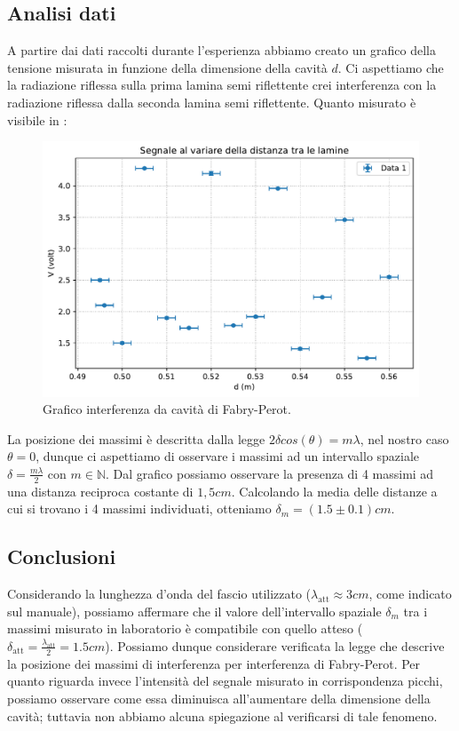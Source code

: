 \documentclass[a4paper]{article}
\begin{document}
\subsection{Analisi dati}
A partire dai dati raccolti durante l'esperienza abbiamo creato un grafico della tensione misurata in funzione della dimensione della cavità $d$. Ci aspettiamo che la radiazione riflessa sulla prima lamina semi riflettente crei interferenza con la radiazione riflessa dalla seconda lamina semi riflettente. Quanto misurato è visibile in :
\begin{figure}[H]
    \centering
    \includegraphics[width=0.8\linewidth]{grafici/fabriperot.pdf}
    \caption{Grafico interferenza da cavità di Fabry-Perot.}
    \label{fig:grafico_Fabry_Perot}
\end{figure}

La posizione dei massimi è descritta dalla legge $2\delta cos(\theta)=m\lambda$, nel nostro caso $\theta=0$, dunque ci aspettiamo di osservare i massimi ad un intervallo spaziale $\delta=\frac{m\lambda}{2}$ con $m\in\mathbb{N}$. Dal grafico possiamo osservare la presenza di 4 massimi ad una distanza reciproca costante di $1,5cm$. Calcolando la media delle distanze a cui si trovano i 4 massimi individuati, otteniamo $\delta_m=(1.5\pm 0.1)cm$.  


\subsection{Conclusioni}
Considerando la lunghezza d'onda del fascio utilizzato ($\lambda_{\text{att}} \approx 3 cm$, come indicato sul manuale), possiamo affermare che il valore dell'intervallo spaziale $\delta_m$ tra i massimi misurato in laboratorio è compatibile con quello atteso ($\delta_{\text{att}}=\frac{\lambda_{\text{att}}}{2}=1.5cm$). Possiamo dunque considerare verificata la legge che descrive la posizione dei massimi di interferenza per interferenza di Fabry-Perot. Per quanto riguarda invece l'intensità del segnale misurato in corrispondenza picchi, possiamo osservare come essa diminuisca all'aumentare della dimensione della cavità; tuttavia non abbiamo alcuna spiegazione al verificarsi di tale fenomeno.
\end{document}
